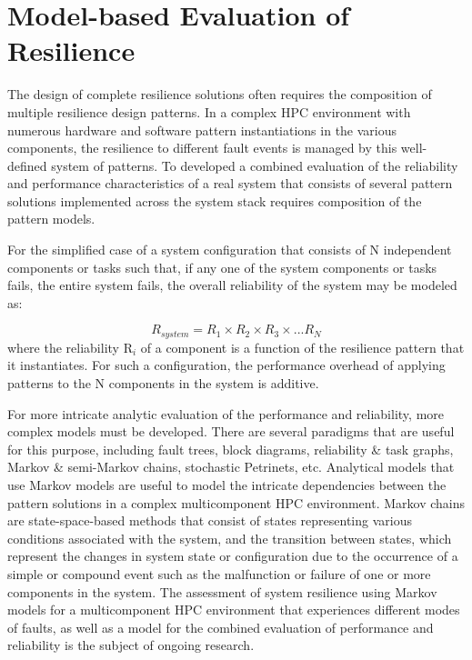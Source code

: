 \section{Model-based Evaluation of Resilience}
\label{sec:Evaluation}

The design of complete resilience solutions often requires the composition of multiple resilience design patterns. In a complex HPC environment with numerous hardware and software pattern instantiations in the various components, the resilience to different fault events is managed by this well-defined system of patterns. To developed a combined evaluation of the reliability and performance characteristics of a real system that consists of several pattern solutions implemented across the system stack requires composition of the pattern models. 

For the simplified case of a system configuration that consists of N independent components or tasks such that, if any one of the system components or tasks fails, the entire system fails, the overall reliability of the system may be modeled as: 

\begin{equation}
R_{system} = R_{1} \times R_{2} \times R_{3} \times . . .  R_{N}  
\label{eq:sys-reliability}
\end{equation}
where the reliability R$_{i}$ of a component is a function of the resilience pattern that it instantiates. For such a configuration, the performance overhead of applying patterns to the N components in the system is additive. 

For more intricate analytic evaluation of the performance and reliability, more complex models must be developed. There are several paradigms that are useful for this purpose, including fault trees, block diagrams, reliability \& task graphs, Markov \& semi-Markov chains, stochastic Petrinets, etc. 
Analytical models that use Markov models are useful to model the intricate dependencies between the pattern solutions in a complex multicomponent HPC environment. Markov chains are state-space-based methods that consist of states representing various conditions associated with the system, and the transition between states, which represent the changes in system state or configuration due to the occurrence of a simple or compound event such as the malfunction or failure of one or more components in the system. The assessment of system resilience using Markov models for a multicomponent HPC environment that experiences different modes of faults, as well as a model for the combined evaluation of performance and reliability is the subject of ongoing research.   
